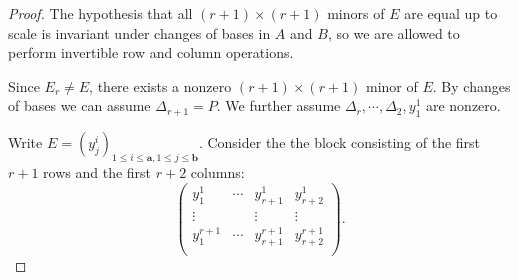 \documentclass[10pt]{article} %
\newcommand{\aaa}{\mathbf{a}}
\newcommand{\bbb}{\mathbf{b}}
\theoremstyle{definition}
\begin{document}
\begin{proof}
The hypothesis that all $(r+1)\times (r+1)$ minors of $E$ are equal up to scale is invariant under changes of bases in $A$ and $B$, so we are allowed to perform invertible row and column operations.

Since $E_r\neq E$, there exists a nonzero $(r+1)\times (r+1)$ minor of $E$. By changes of bases we can assume $\Delta_{r+1}=P$. We further assume $\Delta_{r},\cdots,\Delta_2,y^1_1$ are nonzero.

Write $E=(y^i_j)_{1\leq i\leq \aaa,1\leq j\leq \bbb}$. Consider the the block consisting of the first $r+1$ rows and the first $r+2$ columns:
$$\begin{pmatrix}
y^1_1 & \cdots & y^1_{r+1} & y^1_{r+2} \\
\vdots &      & \vdots & \vdots \\
y^{r+1}_1 & \cdots & y^{r+1}_{r+1} & y^{r+1}_{r+2} \\
\end{pmatrix}.$$


\end{proof}
\end{document}
